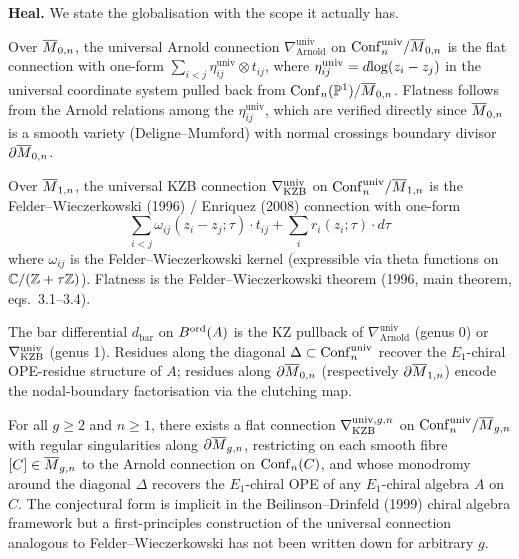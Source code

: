 \textbf{Heal.} We state the globalisation with the scope it actually
has.

\begin{definition}
\label{wn:def:opus-arnold-g0}\ClaimStatusTheorem
Over $\overline{M}_{0,n}$, the universal Arnold connection
$\nabla_{\mathrm{Arnold}}^{\mathrm{univ}}$ on
$\mathrm{Conf}_n^{\mathrm{univ}} / \overline{M}_{0,n}$ is the flat connection with
one-form $\sum_{i < j} \eta_{ij}^{\mathrm{univ}} \otimes t_{ij}$, where
$\eta_{ij}^{\mathrm{univ}} = d{\log}(z_i - z_j)$ in the universal
coordinate system pulled back from $\mathrm{Conf}_n(\mathbb{P}^1) / \overline{M}_{0,n}$.
Flatness follows from the Arnold relations among the
$\eta_{ij}^{\mathrm{univ}}$, which are verified directly since
$\overline{M}_{0,n}$ is a smooth variety (Deligne--Mumford) with normal
crossings boundary divisor $\partial \overline{M}_{0,n}$.
\end{definition}

\begin{definition}
\label{wn:def:opus-kzb-g1}\ClaimStatusTheorem
Over $\overline{M}_{1,n}$, the universal KZB connection
$\nabla_{\mathrm{KZB}}^{\mathrm{univ}}$ on $\mathrm{Conf}_n^{\mathrm{univ}}/\overline{M}_{1,n}$
is the Felder--Wieczerkowski (1996) / Enriquez (2008) connection with
one-form
\[
\sum_{i < j} \omega_{ij}(z_i - z_j; \tau) \cdot t_{ij}
+ \sum_i r_i(z_i; \tau) \cdot d\tau
\]
where $\omega_{ij}$ is the Felder--Wieczerkowski kernel (expressible via
theta functions on $\mathbb{C} / (\mathbb{Z} + \tau \mathbb{Z})$). Flatness is the
Felder--Wieczerkowski theorem (1996, main theorem, eqs.\ 3.1--3.4).
\end{definition}

\begin{theorem}
\label{wn:thm:opus-arnold-kzb-global-low-g}\ClaimStatusTheorem
The bar differential $d_{\mathrm{bar}}$ on $B^{\mathrm{ord}}(A)$ is the KZ pullback
of $\nabla_{\mathrm{Arnold}}^{\mathrm{univ}}$ (genus 0) or
$\nabla_{\mathrm{KZB}}^{\mathrm{univ}}$ (genus 1). Residues along the diagonal
$\Delta \subset \mathrm{Conf}_n^{\mathrm{univ}}$ recover the $E_1$-chiral
OPE-residue structure of $A$; residues along $\partial \overline{M}_{0,n}$
(respectively $\partial \overline{M}_{1,n}$) encode the nodal-boundary
factorisation via the clutching map.
\end{theorem}

\begin{conjecture}
\label{wn:conj:opus-kzb-gg2}\ClaimStatusConjectured
For all $g \ge 2$ and $n \ge 1$, there exists a flat connection
$\nabla_{\mathrm{KZB}}^{\mathrm{univ},g,n}$ on
$\mathrm{Conf}_n^{\mathrm{univ}} / \overline{M}_{g,n}$ with regular singularities
along $\partial \overline{M}_{g,n}$, restricting on each smooth fibre
$[C] \in \overline{M}_{g,n}$ to the Arnold connection on $\mathrm{Conf}_n(C)$, and
whose monodromy around the diagonal $\Delta$ recovers the
$E_1$-chiral OPE of any $E_1$-chiral algebra $A$ on $C$. The conjectural
form is implicit in the Beilinson--Drinfeld (1999) chiral algebra
framework but a first-principles construction of the universal
connection analogous to Felder--Wieczerkowski has not been written
down for arbitrary $g$.
\end{conjecture}

